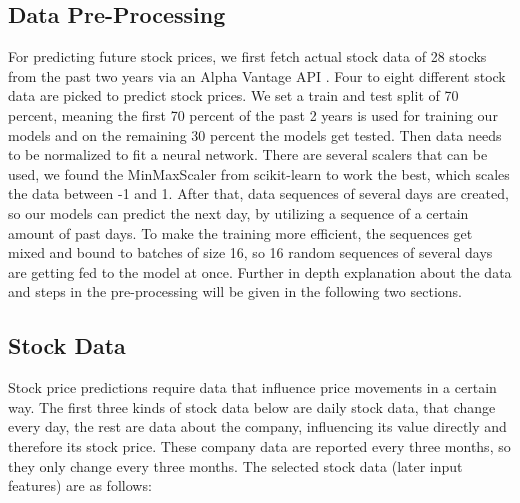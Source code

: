 \subsection{Data Pre-Processing}
For predicting future stock prices, we first fetch actual stock data of 28 stocks from the past two years via an Alpha Vantage API \cite{AlphaVantageAPI}. Four to eight different stock data are picked to predict stock prices. We set a train and test split of 70 percent, meaning the first 70 percent of the past 2 years is used for training our models and on the remaining 30 percent the models get tested. Then data needs to be normalized to fit a neural network. There are several scalers that can be used, we found the MinMaxScaler from scikit-learn \cite{scikit-learn} to work the best, which scales the data between -1 and 1. 
After that, data sequences of several days are created, so our models can predict the next day, by utilizing a sequence of a certain amount of past days.
To make the training more efficient, the sequences get mixed and bound to batches of size 16, so 16 random sequences of several days are getting fed to the model at once. Further in depth explanation about the data and steps in the pre-processing will be given in the following two sections.
\subsection{Stock Data}
Stock price predictions require data that influence price movements in a certain way.
The first three kinds of stock data below are daily stock data, that change every day, the rest are data about the company, influencing its value directly and therefore its stock price. These company data are reported every three months, so they only change every three months.
The selected stock data (later input features) are as follows:

